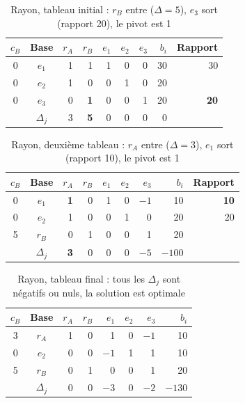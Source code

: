 \documentclass[11pt,a4paper]{article}
\begin{document}
\begin{table}[!htbp]
\centering\footnotesize
\caption{Rayon, tableau initial : $r_B$ entre ($\Delta = 5$), $e_3$ sort (rapport 20), le pivot est 1}\label{tab:r1}
\begin{tabular}{@{}cc|rrrrr|r|r@{}}
\toprule
$c_B$ & Base & $r_A$ & $r_B$ & $e_1$ & $e_2$ & $e_3$ & $b_i$ & Rapport \\
\midrule
0 & $e_1$ & 1 & 1 & 1 & 0 & 0 & 30 & 30 \\
0 & $e_2$ & 1 & 0 & 0 & 1 & 0 & 20 & \\
0 & $e_3$ & 0 & \textbf{1} & 0 & 0 & 1 & 20 & \textbf{20} \\
\midrule
 & $\Delta_j$ & 3 & \textbf{5} & 0 & 0 & 0 & 0 & \\
\bottomrule
\end{tabular}
\end{table}

\begin{table}[!htbp]
\centering\footnotesize
\caption{Rayon, deuxième tableau : $r_A$ entre ($\Delta = 3$), $e_1$ sort (rapport 10), le pivot est 1}\label{tab:r2}
\begin{tabular}{@{}cc|rrrrr|r|r@{}}
\toprule
$c_B$ & Base & $r_A$ & $r_B$ & $e_1$ & $e_2$ & $e_3$ & $b_i$ & Rapport \\
\midrule
0 & $e_1$ & \textbf{1} & 0 & 1 & 0 & $-1$ & 10 & \textbf{10} \\
0 & $e_2$ & 1 & 0 & 0 & 1 & 0 & 20 & 20 \\
5 & $r_B$ & 0 & 1 & 0 & 0 & 1 & 20 & \\
\midrule
 & $\Delta_j$ & \textbf{3} & 0 & 0 & 0 & $-5$ & $-100$ & \\
\bottomrule
\end{tabular}
\end{table}

\begin{table}[!htbp]
\centering\footnotesize
\caption{Rayon, tableau final : tous les $\Delta_j$ sont négatifs ou nuls, la solution est optimale}\label{tab:r3}
\begin{tabular}{@{}cc|rrrrr|r@{}}
\toprule
$c_B$ & Base & $r_A$ & $r_B$ & $e_1$ & $e_2$ & $e_3$ & $b_i$ \\
\midrule
3 & $r_A$ & 1 & 0 & 1 & 0 & $-1$ & 10 \\
0 & $e_2$ & 0 & 0 & $-1$ & 1 & 1 & 10 \\
5 & $r_B$ & 0 & 1 & 0 & 0 & 1 & 20 \\
\midrule
 & $\Delta_j$ & 0 & 0 & $-3$ & 0 & $-2$ & $-130$ \\
\bottomrule
\end{tabular}
\end{table}
\end{document}
